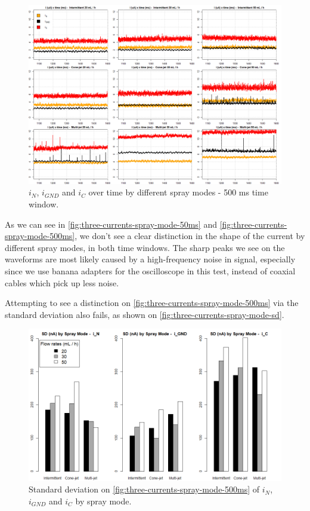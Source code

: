 \documentclass[oneside,12pt]{article}
\begin{document}
\begin{landscape}
    \begin{figure}[h!]
        \centering
        \includegraphics[width=0.75\paperheight,trim=1 1 1 1,clip]{figures/three-currents-spray-mode-500ms.png}
        \caption{$i_N$, $i_{GND}$ and $i_C$ over time by different spray modes - 500 ms time window.}
        \label{fig:three-currents-spray-mode-500ms}
    \end{figure}
\end{landscape}

As we can see in \autoref{fig:three-currents-spray-mode-50ms} and \autoref{fig:three-currents-spray-mode-500ms}, 
we don't see a clear distinction in the shape of the current 
by different spray modes, in both time windows. The sharp peaks we see on the waveforms are most likely caused
by a high-frequency noise in signal, especially since we use banana adapters for the oscilloscope in this test, instead
of coaxial cables which pick up less noise.

Attempting to see a distinction on \autoref{fig:three-currents-spray-mode-500ms} via the standard deviation also
fails, as shown on \autoref{fig:three-currents-spray-mode-sd}.

\begin{figure}[h!]
    \centering
    \includegraphics[width=1\textwidth,trim=1 1 1 1,clip]{figures/three-currents-spray-mode-sd.png}
    \caption{Standard deviation on \autoref{fig:three-currents-spray-mode-500ms} of $i_N$, $i_{GND}$ and $i_C$
    by spray mode.}
    \label{fig:three-currents-spray-mode-sd}
\end{figure}
\end{document}

